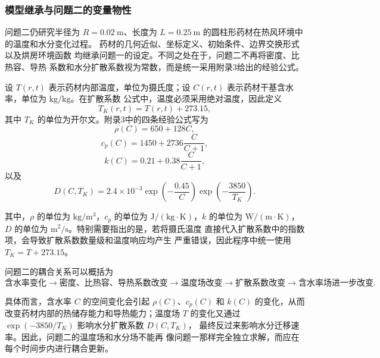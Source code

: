 \documentclass[12pt,a4paper]{article}
\renewcommand{\boxed}[1]{#1}
\begin{document}
\subsubsection{模型继承与问题二的变量物性}

问题二仍研究半径为 $R=0.02\ \mathrm{m}$、长度为
$L=0.25\ \mathrm{m}$ 的圆柱形药材在热风环境中的温度和水分变化过程。
药材的几何近似、坐标定义、初始条件、边界交换形式以及烘房环境函数
均继承问题一的设定。不同之处在于，问题二不再将密度、比热容、导热
系数和水分扩散系数视为常数，而是统一采用附录3给出的经验公式。

设 $T(r,t)$ 表示药材内部温度，单位为摄氏度；设
$C(r,t)$ 表示药材干基含水率，单位为 $\mathrm{kg/kg}$。在扩散系数
公式中，温度必须采用绝对温度，因此定义
\begin{equation}
T_K(r,t)=T(r,t)+273.15,
\end{equation}
其中 $T_K$ 的单位为开尔文。附录3中的四条经验公式写为
\begin{equation}
\boxed{
\rho(C)=650+128C
},
\end{equation}
\begin{equation}
\boxed{
c_p(C)=1450+2736\frac{C}{C+1}
},
\end{equation}
\begin{equation}
\boxed{
k(C)=0.21+0.38\frac{C}{C+1}
},
\end{equation}
以及
\begin{equation}
\boxed{
D(C,T_K)
=
2.4\times10^{-3}
\exp\left(-\frac{0.45}{C}\right)
\exp\left(-\frac{3850}{T_K}\right)
}.
\end{equation}

其中，$\rho$ 的单位为 $\mathrm{kg/m^3}$，$c_p$ 的单位为
$\mathrm{J/(kg\cdot K)}$，$k$ 的单位为 $\mathrm{W/(m\cdot K)}$，
$D$ 的单位为 $\mathrm{m^2/s}$。特别需要指出的是，若将摄氏温度
直接代入扩散系数中的指数项，会导致扩散系数数量级和温度响应均产生
严重错误，因此程序中统一使用 $T_K=T+273.15$。

问题二的耦合关系可以概括为
\begin{equation}
\boxed{
\text{含水率变化}
\longrightarrow
\text{密度、比热容、导热系数改变}
\longrightarrow
\text{温度场改变}
\longrightarrow
\text{扩散系数改变}
\longrightarrow
\text{含水率场进一步改变}
}.
\end{equation}

具体而言，含水率 $C$ 的空间变化会引起 $\rho(C)$、$c_p(C)$ 和
$k(C)$ 的变化，从而改变药材内部的热储存能力和导热能力；温度场
$T$ 的变化又通过 $\exp(-3850/T_K)$ 影响水分扩散系数 $D(C,T_K)$，
最终反过来影响水分迁移速率。因此，问题二的温度场和水分场不能再
像问题一那样完全独立求解，而应在每个时间步内进行耦合更新。
\end{document}
